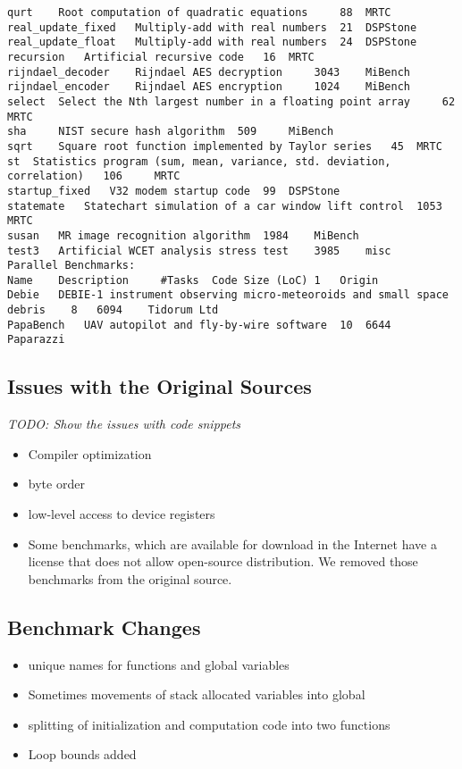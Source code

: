 \documentclass[a4paper,UKenglish]{oasics}
\newcommand{\todo}[1]{{\emph{TODO: #1}}}
\begin{document}
\begin{verbatim}
qurt 	Root computation of quadratic equations 	88 	MRTC
real_update_fixed 	Multiply-add with real numbers 	21 	DSPStone
real_update_float 	Multiply-add with real numbers 	24 	DSPStone
recursion 	Artificial recursive code 	16 	MRTC
rijndael_decoder 	Rijndael AES decryption 	3043 	MiBench
rijndael_encoder 	Rijndael AES encryption 	1024 	MiBench
select 	Select the Nth largest number in a floating point array 	62 	MRTC
sha 	NIST secure hash algorithm 	509 	MiBench
sqrt 	Square root function implemented by Taylor series 	45 	MRTC
st 	Statistics program (sum, mean, variance, std. deviation, correlation) 	106 	MRTC
startup_fixed 	V32 modem startup code 	99 	DSPStone
statemate 	Statechart simulation of a car window lift control 	1053 	MRTC
susan 	MR image recognition algorithm 	1984 	MiBench
test3 	Artificial WCET analysis stress test 	3985 	misc
Parallel Benchmarks:
Name 	Description 	#Tasks 	Code Size (LoC) 1 	Origin
Debie 	DEBIE-1 instrument observing micro-meteoroids and small space debris 	8 	6094 	Tidorum Ltd
PapaBench 	UAV autopilot and fly-by-wire software 	10 	6644 	Paparazzi
\end{verbatim}


\subsection{Issues with the Original Sources}


\todo{Show the issues with code snippets}

\begin{itemize}
\item Compiler optimization
\item byte order
\item low-level access to device registers
\item Some benchmarks, which are available for download in the Internet have a license that
does not allow open-source distribution. We removed those benchmarks from the original source.
\end{itemize}

\subsection{Benchmark Changes}



\begin{itemize}
\item unique names for functions and global variables
\item Sometimes movements of stack allocated variables into global
\item splitting of initialization and computation code into two functions
\item Loop bounds added
\end{itemize}
\end{document}
